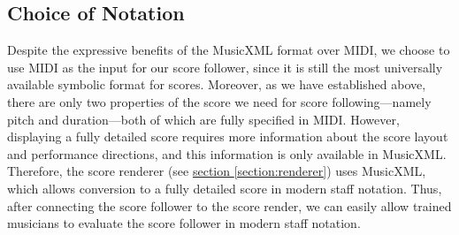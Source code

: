 \subsection{Choice of Notation}{\label{subsection:choice_notation}}
Despite the expressive benefits of the MusicXML format over MIDI, we choose to use MIDI as the input for our score follower, since it is still the most universally available symbolic format for scores. Moreover, as we have established above, there are only two properties of the score we need for score following—namely pitch and duration—both of which are fully specified in MIDI. However, displaying a fully detailed score requires more information about the score layout and performance directions, and this information is only available in MusicXML. Therefore, the score renderer (see \hyperref[section:renderer]{section \ref*{section:renderer}}) uses MusicXML, which allows conversion to a fully detailed score in modern staff notation. Thus, after connecting the score follower to the score render, we can easily allow trained musicians to evaluate the score follower in modern staff notation.



